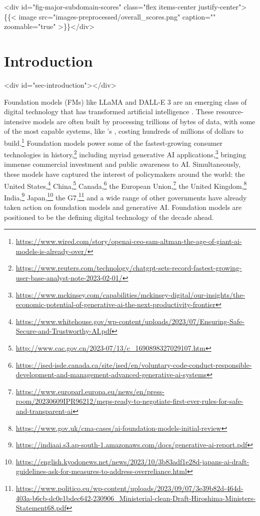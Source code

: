 \documentclass[screen, authorversion, acmsmall]{acmart}
\begin{document}
<div id="fig-major-subdomain-scores" class="flex items-center justify-center">\{\{< image src="images-preprocessed/overall_scores.png" caption="" zoomable="true" >\}\}</div>



\clearpage
\renewcommand{\baselinestretch}{0.9685}\normalsize 
{}
\tableofcontents
{}
\renewcommand{\baselinestretch}{1.0}\normalsize 
\clearpage


\setlength{\parindent}{0cm}
\setlength{\parskip}{4pt}
\sloppy
\hypertarget{introduction}{\section{Introduction}}
<div id="sec-introduction"></div>

Foundation models (FMs) like LLaMA and DALL-E 3 are an emerging class of digital technology that has transformed artificial intelligence \citep{bommasani2021opportunities}. 
These resource-intensive models are often built by processing trillions of bytes of data, with some of the most capable systems, like \openai's \gptfour, costing hundreds of millions of dollars to build.\footnote{\url{https://www.wired.com/story/openai-ceo-sam-altman-the-age-of-giant-ai-models-is-already-over/}} 
Foundation models power some of the fastest-growing consumer technologies in history,\footnote{\url{https://www.reuters.com/technology/chatgpt-sets-record-fastest-growing-user-base-analyst-note-2023-02-01/}}
including myriad generative AI applications,\footnote{\url{https://www.mckinsey.com/capabilities/mckinsey-digital/our-insights/the-economic-potential-of-generative-ai-the-next-productivity-frontier}} bringing immense commercial investment and public awareness to AI. 
Simultaneously, these models have captured the interest of policymakers around the world: the United States,\footnote{\url{https://www.whitehouse.gov/wp-content/uploads/2023/07/Ensuring-Safe-Secure-and-Trustworthy-AI.pdf} } China,\footnote{\url{http://www.cac.gov.cn/2023-07/13/c_1690898327029107.htm}} Canada,\footnote{\url{https://ised-isde.canada.ca/site/ised/en/voluntary-code-conduct-responsible-development-and-management-advanced-generative-ai-systems}} the European Union,\footnote{\url{https://www.europarl.europa.eu/news/en/press-room/20230609IPR96212/meps-ready-to-negotiate-first-ever-rules-for-safe-and-transparent-ai}} the United Kingdom,\footnote{\url{https://www.gov.uk/cma-cases/ai-foundation-models-initial-review}} India,\footnote{\url{https://indiaai.s3.ap-south-1.amazonaws.com/docs/generative-ai-report.pdf}} Japan,\footnote{\url{https://english.kyodonews.net/news/2023/10/3b83adf1e28d-japans-ai-draft-guidelines-ask-for-measures-to-address-overreliance.html}} the G7,\footnote{\url{https://www.politico.eu/wp-content/uploads/2023/09/07/3e39b82d-464d-403a-b6cb-dc0e1bdec642-230906_Ministerial-clean-Draft-Hiroshima-Ministers-Statement68.pdf}} and a wide range of other governments have already taken action on foundation models and generative AI.
Foundation models are positioned to be the defining digital technology of the decade ahead.
\end{document}
